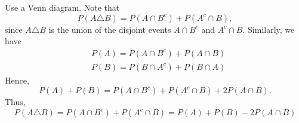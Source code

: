 
\setcounter{theorem}{44}
\begin{exercise}[BH.1.45]
\begin{solution}
	Use a Venn diagram. Note that 
	$$P(A \triangle B)=P\left(A \cap B^c\right)+P\left(A^c \cap B\right),$$
	since $A \triangle B$ is the union of the disjoint events $A \cap B^c$ and $A^c \cap B$. Similarly, we have
	$$
	\begin{aligned}
		&P(A)=P\left(A \cap B^c\right)+P(A \cap B) \\
		&P(B)=P\left(B \cap A^c\right)+P(B \cap A)
	\end{aligned}
	$$
	Hence,
	$$
	P(A)+P(B)=P\left(A \cap B^c\right)+P\left(A^c \cap B\right)+2 P(A \cap B) .
	$$
	Thus,
	$$
	P(A \triangle B)=P\left(A \cap B^c\right)+P\left(A^c \cap B\right)=P(A)+P(B)-2 P(A \cap B)
	$$
\end{solution}
\end{exercise}


